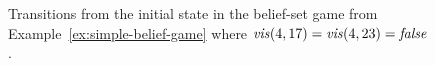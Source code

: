 

\begin{figure}


\vspace{-.3cm}
\caption{Transitions from the initial state in the belief-set game from Example~\ref{ex:simple-belief-game} where $\mathit{vis}(4,17) = \mathit{vis}(4,23) = \mathit{false}$.}
\label{fig:simple-belief-game}
\vspace{-.5cm}
\end{figure}


